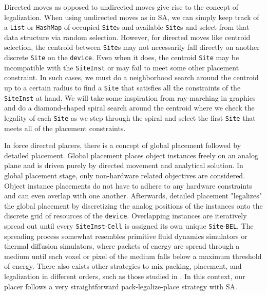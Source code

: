Directed moves as opposed to undirected moves give rise to the concept of legalization. 
When using undirected moves as in SA, we can simply keep track of a \texttt{List} or \texttt{HashMap} of occupied \texttt{Site}s and available \texttt{Site}s and select from that data structure via random selection. 
However, for directed moves like centroid selection, the centroid between \texttt{Site}s may not necessarily fall directly on another discrete \texttt{Site} on the \texttt{device}. 
Even when it does, the centroid \texttt{Site} may be incompatible with the \texttt{SiteInst} or may fail to meet some other placement constraint. 
In such cases, we must do a neighborhood search around the centroid up to a certain radius to find a \texttt{Site} that satisfies all the constraints of the \texttt{SiteInst} at hand. 
We will take some inspiration from ray-marching in graphics and do a diamond-shaped spiral search around the centroid where we check the legality of each \texttt{Site} as we step through the spiral and select the first \texttt{Site} that meets all of the placement constraints. 

In force directed placers, there is a concept of global placement followed by detailed placement.
Global placement places object instances freely on an analog plane and is driven purely by directed movement and analytical solution.
In global placement stage, only non-hardware related objectives are considered. 
Object instance placements do not have to adhere to any hardware constraints and can even overlap with one another.
Afterwards, detailed placement "legalizes" the global placement by discretizing the analog positions of the instances onto the discrete grid of resources of the \texttt{device}.
Overlapping instances are iteratively spread out until every \texttt{SiteInst}-\texttt{Cell} is assigned its own unique \texttt{Site}-\texttt{BEL}.
The spreading process somewhat resembles primitive fluid dynamics simulators or thermal diffusion simulators, where packets of energy are spread through a medium until each voxel or pixel of the medium falls below a maximum threshold of energy. 
There also exists other strategies to mix packing, placement, and legalization in different orders, such as those studied in \cite{ExplicitPacking}. 
In this context, our placer follows a very straightforward pack-legalize-place strategy with SA. 




